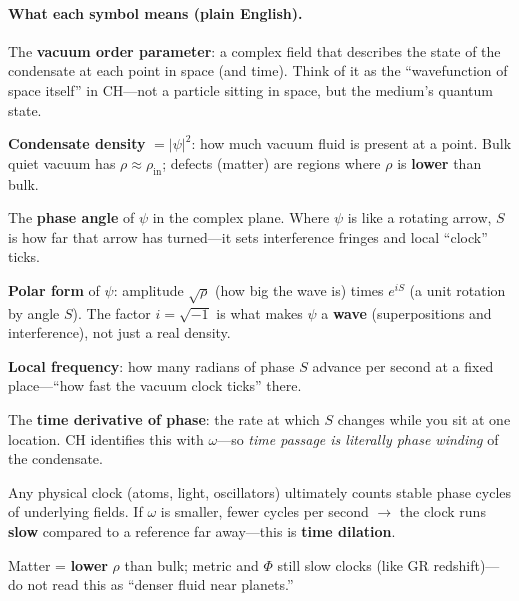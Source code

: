 \documentclass[11pt,a4paper]{article}
\begin{document}
\paragraph{What each symbol means (plain English).}
\begin{description}[style=nextline, leftmargin=1.5em, font=\normalfont]
  \item[$\psi$ (psi)]
    The \textbf{vacuum order parameter}: a complex field that describes the state of the condensate at each point in space (and time).
    Think of it as the ``wavefunction of space itself'' in CH---not a particle sitting in space, but the medium's quantum state.
  \item[$\rho$ (rho)]
    \textbf{Condensate density} $= |\psi|^2$: how much vacuum fluid is present at a point.
    Bulk quiet vacuum has $\rho \approx \rho_{\mathrm{in}}$; defects (matter) are regions where $\rho$ is \textbf{lower} than bulk.
  \item[$S$ (phase)]
    The \textbf{phase angle} of $\psi$ in the complex plane.
    Where $\psi$ is like a rotating arrow, $S$ is how far that arrow has turned---it sets interference fringes and local ``clock'' ticks.
  \item[$\sqrt{\rho}\,e^{iS}$]
    \textbf{Polar form} of $\psi$: amplitude $\sqrt{\rho}$ (how big the wave is) times $e^{iS}$ (a unit rotation by angle $S$).
    The factor $i=\sqrt{-1}$ is what makes $\psi$ a \textbf{wave} (superpositions and interference), not just a real density.
  \item[$\omega$ (omega)]
    \textbf{Local frequency}: how many radians of phase $S$ advance per second at a fixed place---``how fast the vacuum clock ticks'' there.
  \item[$\partial S/\partial t$]
    The \textbf{time derivative of phase}: the rate at which $S$ changes while you sit at one location.
    CH identifies this with $\omega$---so \emph{time passage is literally phase winding} of the condensate.
  \item[Clock rate $\propto \omega$]
    Any physical clock (atoms, light, oscillators) ultimately counts stable phase cycles of underlying fields.
    If $\omega$ is smaller, fewer cycles per second $\to$ the clock runs \textbf{slow} compared to a reference far away---this is \textbf{time dilation}.
  \item[Depletion near mass]
    Matter = \textbf{lower} $\rho$ than bulk; metric and $\Phi$ still slow clocks (like GR redshift)---do not read this as ``denser fluid near planets.''
  \item[Flow $\mathbf{v}$]

\end{description}
\end{document}
